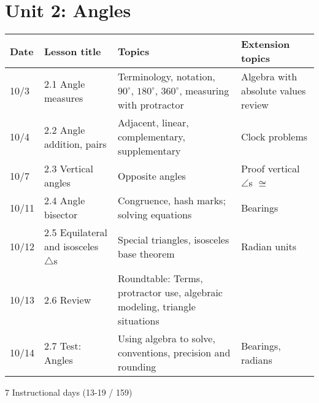 \documentclass[12pt, twoside]{article}
\begin{document}
\newpage
\section*{Unit 2: Angles}
\begin{tabular}{|p{0.9cm}|p{4cm}|p{7cm}|p{5cm}|}
  \hline
  Date & Lesson title & Topics  & Extension topics \\
  \hline
  10/3 & 2.1 Angle measures & Terminology, notation, $90^\circ$, $180^\circ$, $360^\circ$, measuring with protractor & Algebra with absolute values review \\
  \hline
  10/4 & 2.2 Angle addition, pairs & Adjacent, linear, complementary, supplementary & Clock problems \\
  \hline
  10/7 & 2.3 Vertical angles & Opposite angles & Proof vertical $\angle$s $\cong$ \\
  \hline
  10/11 & 2.4 Angle bisector & Congruence, hash marks; solving equations & Bearings \\
  \hline
  10/12 & 2.5 Equilateral and isosceles $\triangle$s & Special triangles, isosceles base theorem & Radian units \\
  \hline
  10/13 & 2.6 Review & Roundtable: Terms, protractor use, algebraic modeling, triangle situations & \\
  \hline
  10/14 & 2.7 Test: Angles & Using algebra to solve, conventions, precision and rounding & Bearings, radians \\
  \hline

\end{tabular} \par \vspace*{0.3cm}
7 Instructional days (13-19 / 159)
\end{document}
